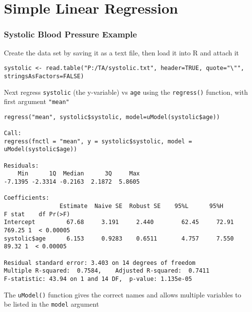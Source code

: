 \documentclass[pdf]{beamer}
\begin{document}
\section{Simple Linear Regression}
\begin{frame}[fragile]
\frametitle{Systolic Blood Pressure Example}
Create the data set by saving it as a text file, then load it into R and attach it
{\fontsize{6pt}{4.2}\selectfont
\begin{verbatim}
systolic <- read.table("P:/TA/systolic.txt", header=TRUE, quote="\"", stringsAsFactors=FALSE)
\end{verbatim}}

Next regress \texttt{systolic} (the y-variable) vs \texttt{age} using the \texttt{regress()} function, with first argument \texttt{"mean"}
{\fontsize{6pt}{4.2}\selectfont
\begin{verbatim}
regress("mean", systolic$systolic, model=uModel(systolic$age))

Call:
regress(fnctl = "mean", y = systolic$systolic, model = uModel(systolic$age))

Residuals:
    Min      1Q  Median      3Q     Max 
-7.1395 -2.3314 -0.2163  2.1872  5.8605 

Coefficients:
                Estimate  Naive SE  Robust SE    95%L      95%H         F stat    df Pr(>F)   
Intercept         67.68     3.191     2.440        62.45     72.91         769.25 1  < 0.00005
systolic$age      6.153     0.9283    0.6511       4.757     7.550          89.32 1  < 0.00005

Residual standard error: 3.403 on 14 degrees of freedom
Multiple R-squared:  0.7584,	Adjusted R-squared:  0.7411 
F-statistic: 43.94 on 1 and 14 DF,  p-value: 1.135e-05
\end{verbatim}}

The \texttt{uModel()} function gives the correct names and allows multiple variables to be listed in the \texttt{model} argument
\end{frame}
\end{document}
